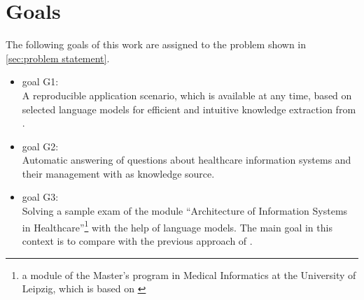 \section{Goals}\label{sec:goals}
The following goals of this work are assigned to the problem shown in \cref{sec:problem statement}.
\begin{itemize}
  \item goal G1:\\
    A reproducible application scenario, which is available at any time, based on selected language models for efficient and intuitive knowledge extraction from \citet{bb2}.
   \item goal G2:\\
    Automatic answering of questions about healthcare information systems and their management with \citet{bb2} as knowledge source. 
  \item goal G3:\\
   Solving a sample exam of the module \enquote{Architecture of Information Systems in Healthcare}\footnote{\raggedright{}a module of the Master's program in Medical Informatics at the University of Leipzig, which is based on \citet{bb2}} with the help of language models.
   The main goal in this context is to compare with the previous approach of \citet{Paul_Keller}.
   
\end{itemize}
